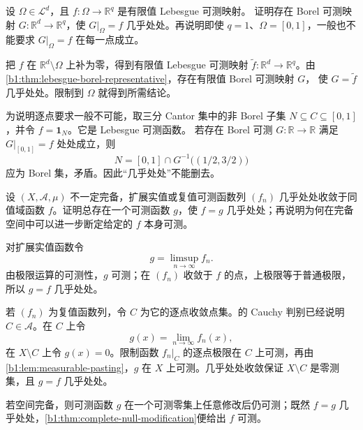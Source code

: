 \begin{exercise}\label{b1:ex:0403}
设 \(\Omega\in\mathcal L^d\)，且 \(f:\Omega\to\mathbb R^q\) 是有限值 Lebesgue 可测映射。
证明存在 Borel 可测映射 \(G:\mathbb R^d\to\mathbb R^q\)，使
\(G|_\Omega=f\) 几乎处处。再说明即使 \(q=1\)、\(\Omega=[0,1]\)，一般也不能要求
\(G|_\Omega=f\) 在每一点成立。
\end{exercise}
\begin{solution}
把 \(f\) 在 \(\mathbb R^d\setminus\Omega\) 上补为零，得到有限值 Lebesgue 可测映射
\(\widetilde f:\mathbb R^d\to\mathbb R^q\)。由
\cref{b1:thm:lebesgue-borel-representative}，存在有限值 Borel 可测映射 \(G\)，
使 \(G=\widetilde f\) 几乎处处。限制到 \(\Omega\) 就得到所需结论。

为说明逐点要求一般不可能，取三分 Cantor 集中的非 Borel 子集
\(N\subseteq C\subseteq[0,1]\)，并令 \(f=\mathbf1_N\)。它是 Lebesgue 可测函数。
若存在 Borel 可测 \(G:\mathbb R\to\mathbb R\) 满足 \(G|_{[0,1]}=f\) 处处成立，则
\[
 N=[0,1]\cap G^{-1}\bigl((1/2,3/2)\bigr)
\]
应为 Borel 集，矛盾。因此“几乎处处”不能删去。
\end{solution}

\begin{exercise}\label{b1:ex:0404}
设 \((X,\mathcal A,\mu)\) 不一定完备，扩展实值或复值可测函数列 \((f_n)\) 几乎处处收敛于同值域函数 \(f\)。证明总存在一个可测函数 \(g\)，使 \(f=g\) 几乎处处；再说明为何在完备空间中可以进一步断定给定的 \(f\) 本身可测。
\end{exercise}
\begin{solution}
对扩展实值函数令
\[
g=\limsup_{n\to\infty}f_n.
\]
由极限运算的可测性，\(g\) 可测；在 \((f_n)\) 收敛于 \(f\) 的点，上极限等于普通极限，所以 \(g=f\) 几乎处处。

若 \((f_n)\) 为复值函数列，令 \(C\) 为它的逐点收敛点集。的 Cauchy 判别已经说明 \(C\in\mathcal A\)。在 \(C\) 上令
\[
g(x)=\lim_{n\to\infty}f_n(x),
\]
在 \(X\setminus C\) 上令 \(g(x)=0\)。限制函数 \(f_n|_C\) 的逐点极限在 \(C\) 上可测，再由\cref{b1:lem:measurable-pasting}，\(g\) 在 \(X\) 上可测。几乎处处收敛保证 \(X\setminus C\) 是零测集，且 \(g=f\) 几乎处处。

若空间完备，则可测函数 \(g\) 在一个可测零集上任意修改后仍可测；既然 \(f=g\) 几乎处处，\cref{b1:thm:complete-null-modification}便给出 \(f\) 可测。
\end{solution}

